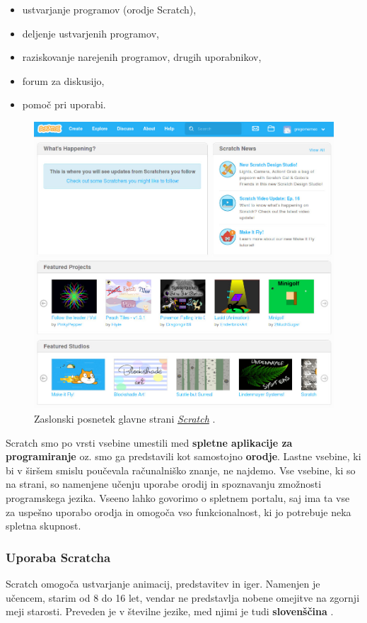 \begin{itemize}
\item ustvarjanje programov (orodje Scratch),
\item deljenje ustvarjenih programov,
\item raziskovanje narejenih programov, drugih uporabnikov,
\item forum za diskusijo,
\item pomoč pri uporabi.
\end{itemize}

\begin{figure}[h!]
  \centering
    \includegraphics [width=0.65\linewidth, keepaspectratio =
   1] {./images/sc_web/scratch_mainP-v01.jpg}
   \caption{Zaslonski posnetek glavne strani
     \emph{\href{https://scratch.mit.edu/}{Scratch}}
     \cite{web:scratch}.}
    \label{fig:web:scratch:main}
\end{figure}

Scratch smo po vrsti vsebine umestili med \textbf{spletne aplikacije
  za programiranje} oz. smo ga predstavili kot samostojno
\textbf{orodje}. Lastne vsebine, ki bi v širšem smislu poučevala
računalniško znanje, ne najdemo. Vse vsebine, ki so na strani, so
namenjene učenju uporabe orodij in spoznavanju zmožnosti programskega
jezika. Vseeno lahko govorimo o spletnem portalu, saj ima ta vse za
uspešno uporabo orodja in omogoča vso funkcionalnost, ki jo potrebuje
neka spletna skupnost.

\subsubsection{Uporaba Scratcha}
\label{sec:uporaba_scratcha}

Scratch omogoča ustvarjanje animacij, predstavitev in iger. Namenjen je učencem, starim od
8 do 16 let, vendar ne predstavlja nobene omejitve na zgornji
meji starosti. Preveden je v številne jezike, med njimi je tudi
\textbf{slovenščina} \cite{web:scratch:about}.


